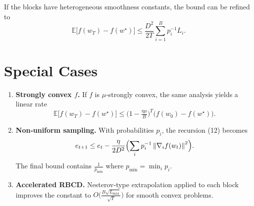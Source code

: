 \documentclass{article}
\newcommand{\EE}{\mathbb{E}}
\newcommand{\norm}[1]{\left\|#1\right\|}
\newcommand{\grad}[1]{\nabla_{#1}}
\begin{document}
If the blocks have heterogeneous smoothness constants,
the bound can be refined to
\[
\EE\!\bigl[f(w_T)-f(w^{\star})\bigr]
\le \frac{D^{2}}{2T}\sum_{i=1}^{B}p_i^{-1}L_i .
\]

\section*{Special Cases}
\begin{enumerate}[label=\arabic*.]
\item \textbf{Strongly convex $f$.}  
If $f$ is $\mu$‑strongly convex, the same analysis yields a linear rate
\[
\EE\!\bigl[f(w_T)-f(w^{\star})\bigr]
\le \bigl(1-\tfrac{\eta\mu}{B}\bigr)^{T}\bigl(f(w_0)-f(w^{\star})\bigr).
\]

\item \textbf{Non‑uniform sampling.}  
With probabilities $p_i$, the recursion (12) becomes
\[
e_{t+1}\le e_t-\frac{\eta}{2D^{2}}\Bigl(\sum_{i}p_i^{-1}\norm{\grad{i}f(w_t)}^{2}\Bigr) .
\]
The final bound contains $\displaystyle \frac{1}{p_{\min}}$ where
$p_{\min}=\min_i p_i$.

\item \textbf{Accelerated RBCD.}  
Nesterov‑type extrapolation applied to each block improves the constant
to $O\!\bigl(\frac{B\sqrt{L_{\max}}}{\sqrt{T}}\bigr)$ for smooth convex problems.
\end{enumerate}
\end{document}
